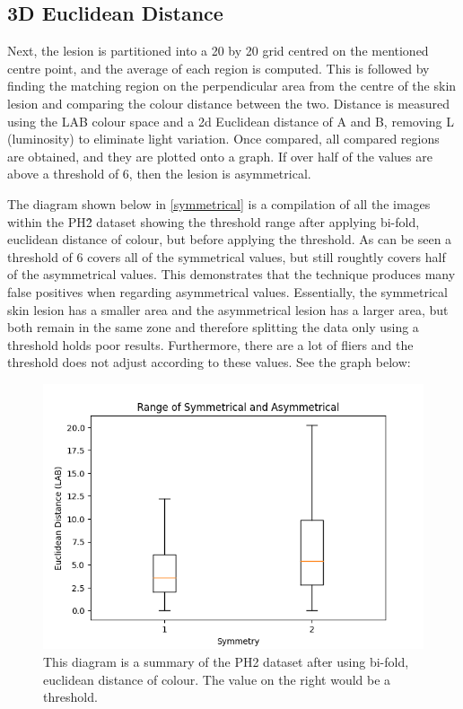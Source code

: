 
\subsection{3D Euclidean Distance}
Next, the lesion is partitioned into a 20 by 20 grid centred on the mentioned centre point, and the average of each region is computed. This is followed by finding the matching region on the perpendicular area from the centre of the skin lesion and comparing the colour distance between the two. Distance is measured using the LAB colour space and a 2d Euclidean distance of A and B, removing L (luminosity) to eliminate light variation. Once compared, all compared regions are obtained, and they are plotted onto a graph. If over half of the values are above a threshold of 6, then the lesion is asymmetrical.

The diagram shown below in \ref{symmetrical} is a compilation of all the images within the PH\^2 dataset showing the threshold range after applying bi-fold, euclidean distance of colour, but before applying the threshold. As can be seen a threshold of 6 covers all of the symmetrical values, but still roughtly covers half of the asymmetrical values. This demonstrates that the technique produces many false positives when regarding asymmetrical values.
Essentially, the symmetrical skin lesion has a smaller area and the asymmetrical lesion has a larger area, but both remain in the same zone and therefore splitting the data only using a threshold holds poor results. Furthermore, there are a lot of fliers and the threshold does not adjust according to these values. See the graph below:

\begin{figure} 
    \centering
    \includegraphics[scale=0.6]{images/symmetrical.png}
\caption{This diagram is a summary of the PH2 dataset after using bi-fold, euclidean distance of colour. The value on the right would be a threshold.}
\end{figure} \label{symmetrical}
    
